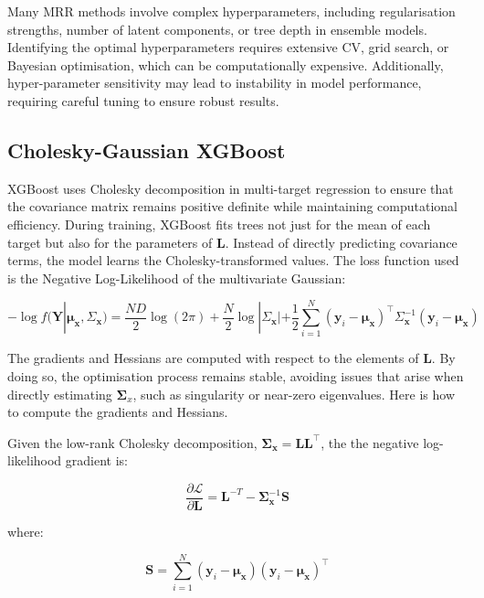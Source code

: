 Many MRR methods involve complex hyperparameters, including regularisation strengths, number of latent components, or tree depth in ensemble models. Identifying the optimal hyperparameters requires extensive CV, grid search, or Bayesian optimisation, which can be computationally expensive. Additionally, hyper-parameter sensitivity may lead to instability in model performance, requiring careful tuning to ensure robust results.

\subsection{Cholesky-Gaussian XGBoost}
XGBoost uses Cholesky decomposition in multi-target regression to ensure that the covariance matrix remains positive definite while maintaining computational efficiency. During training, XGBoost fits trees not just for the mean of each target but also for the parameters of \( \mathbf{L} \). Instead of directly predicting covariance terms, the model learns the Cholesky-transformed values. The loss function used is the Negative Log-Likelihood of the multivariate Gaussian:

\begin{equation*}
-\log f(\mathbf{Y} | \boldsymbol{\mu}_{\mathbf{x}}, \Sigma_{\mathbf{x}}) =
\frac{ND}{2} \log (2\pi) + \frac{N}{2} \log |\Sigma_{\mathbf{x}}| 
+ \frac{1}{2} \sum_{i=1}^{N} (\mathbf{y}_i - \boldsymbol{\mu}_{\mathbf{x}})^\top 
\Sigma_{\mathbf{x}}^{-1} (\mathbf{y}_i - \boldsymbol{\mu}_{\mathbf{x}})    
\end{equation*}

\noindent The gradients and Hessians are computed with respect to the elements of \( \mathbf{L} \). By doing so, the optimisation process remains stable, avoiding issues that arise when directly estimating \( \mathbf{\Sigma}_x \), such as singularity or near-zero eigenvalues. Here is how to compute the gradients and Hessians.



\noindent Given the low-rank Cholesky decomposition, \( \mathbf{\Sigma}_{\mathbf{x}} = \mathbf{L} \mathbf{L}^\top \), the the negative log-likelihood gradient is:

\[
\frac{\partial \mathcal{L}}{\partial \mathbf{L}} = \mathbf{L}^{-T} - \mathbf{\Sigma}_{\mathbf{x}}^{-1} \mathbf{S}
\]

\noindent where:

\[
\mathbf{S} = \sum_{i=1}^{N} (\mathbf{y}_i - \boldsymbol{\mu}_{\mathbf{x}})(\mathbf{y}_i - \boldsymbol{\mu}_{\mathbf{x}})^\top
\]


